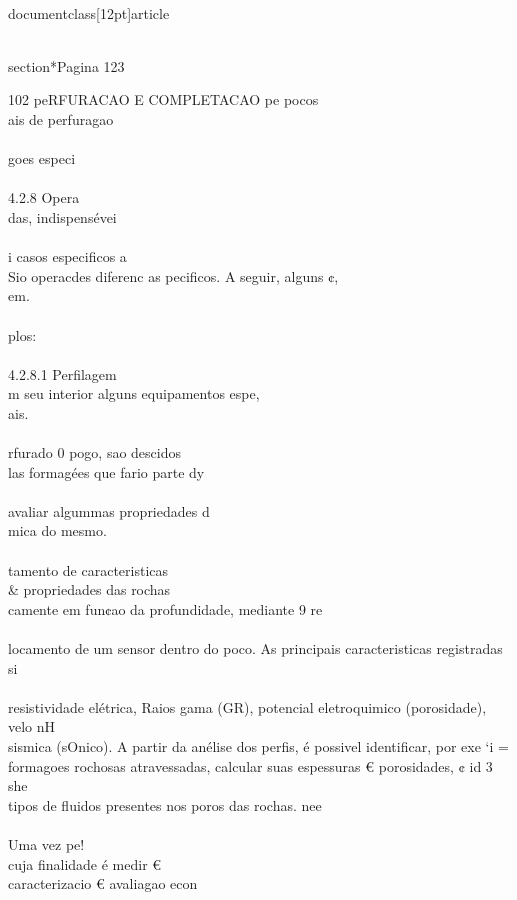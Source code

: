 \\documentclass[12pt]{article}
\begin{document}
\\section*{Pagina 123}

102 peRFURACAO E COMPLETACAO pe pocos\\
ais de perfuragao\\
\\
goes especi\\
\\
4.2.8 Opera\\
das, indispensévei\\
\\
i casos especificos a\\
Sio operacdes diferenc as pecificos. A seguir, alguns ¢,\\
em.\\
\\
plos:\\
\\
4.2.8.1 Perfilagem\\
m seu interior alguns equipamentos espe,\\
ais.\\
\\
rfurado 0 pogo, sao descidos\\
las formagées que fario parte dy\\
\\
avaliar algummas propriedades d\\
mica do mesmo.\\
\\
tamento de caracteristicas \\& propriedades das rochas\\
camente em fun¢ao da profundidade, mediante 9 re\\
\\
locamento de um sensor dentro do poco. As principais caracteristicas registradas si\\
\\
resistividade elétrica, Raios gama (GR), potencial eletroquimico (porosidade), velo nH\\
sismica (sOnico). A partir da anélise dos perfis, é possivel identificar, por exe ‘i =\\
formagoes rochosas atravessadas, calcular suas espessuras € porosidades, ¢ id 3 she\\
tipos de fluidos presentes nos poros das rochas. nee\\
\\
Uma vez pe!\\
cuja finalidade é medir €\\
caracterizacio € avaliagao econ\\
\end{document}
